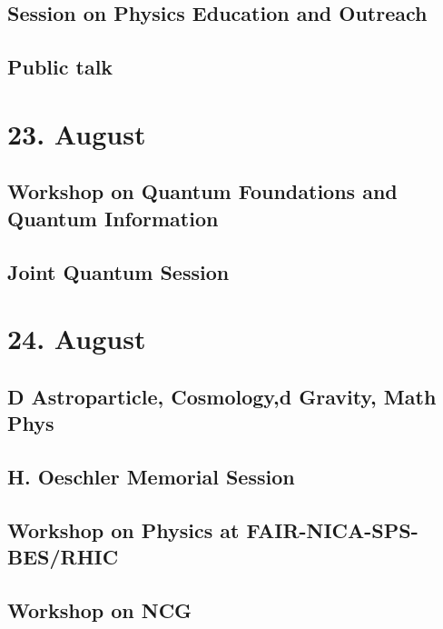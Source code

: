 \subsection{Session on Physics Education  and Outreach}

\clearpage

\subsection{Public talk}

\clearpage

\section{23. August}
\subsection{Workshop on Quantum Foundations and Quantum Information}

\clearpage

\subsection{Joint Quantum Session}

\clearpage

\section{24. August}
\subsection{D Astroparticle, Cosmology,d Gravity, Math Phys}

\clearpage

\subsection{H. Oeschler Memorial Session}

\clearpage

\subsection{Workshop on Physics at FAIR-NICA-SPS-BES/RHIC}

\clearpage

\subsection{Workshop on NCG}

\clearpage


